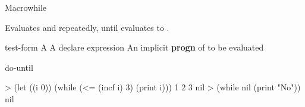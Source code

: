 \documentclass[10pt,twoside,english,pdftex]{article}
\begin{document}

\begin{functiondoc}{Macro}{while}{ 
    \superstar{}
    \superstar}
%
  
\fnsyntax

\fnpurpose Evaluates  and  repeatedly,
until  evaluates to \nil.

\fnpackage {}

\fnmodule {}

\fnargs
\begin{args}{test-form}
 A 
\arg[declaration] A declare expression
\arg[forms] An implicit \textbf{progn} of  to be evaluated
\end{args}

\begin{alsos}{do-until}
\also[do-until]
\also[until]
\end{alsos}

\fnexamples
%
\W\supp
\begin{example}
> (let ((i 0)) 
    (while (<= (incf i) 3) 
       (print i)))
1 
2 
3 
nil\goodpagebreak
> (while nil (print "No"))
nil
\end{example}

\end{functiondoc}

\end{document}
